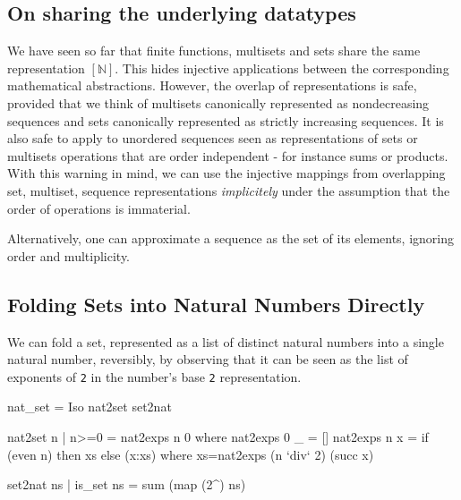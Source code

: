 \documentclass[]{INCLUDES/llncs}
\begin{document}

\subsection{On sharing the underlying datatypes}
We have seen so far that finite functions, multisets and sets share the same
representation $[\mathbb{N}]$. This hides injective applications between the 
corresponding mathematical abstractions.
However, the overlap of representations is safe, provided that we think of 
multisets canonically represented as nondecreasing sequences and sets 
canonically represented as strictly increasing sequences. It is also safe to apply
to unordered sequences seen as representations of sets or multisets
operations that are order independent - for instance sums or products.
With this warning in mind, we can use the injective mappings from
overlapping set, multiset, sequence representations {\em implicitely}
under the assumption that the order of operations is immaterial.

Alternatively, one can approximate a sequence as the set of its elements,
ignoring order and multiplicity.

\subsection{Folding Sets into Natural Numbers Directly} \label{natset}
We can fold a set, represented as a list of distinct
natural numbers into a single natural number,
reversibly, by observing that it can be seen
as the list of exponents of {\tt 2} in the number's
base {\tt 2} representation.

\begin{code}
nat_set = Iso nat2set set2nat 

nat2set n | n>=0 = nat2exps n 0 where
  nat2exps 0 _ = []
  nat2exps n x = 
    if (even n) then xs else (x:xs) where
      xs=nat2exps (n `div` 2) (succ x)

set2nat ns | is_set ns = sum (map (2^) ns)
\end{code}
\end{document}
